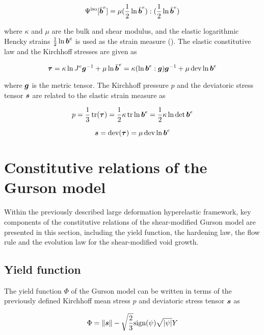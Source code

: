 \begin{equation}
  \Psi^{\rm iso}[\bar{{\boldsymbol{b}}}^e] =
  \mu(\frac{1}{2}\ln\bar{{\boldsymbol{b}}}^e):(\frac{1}{2}\ln\bar{{\boldsymbol{b}}}^e)
\end{equation}

where $\kappa$ and $\mu$ are the bulk and shear modulus, and the
elastic logarithmic Hencky strains $\frac{1}{2}\ln{\boldsymbol{b}}^e$ is used as
the strain measure (\cite{Steinmann1994}). The elastic constitutive
law and the Kirchhoff stresses are given as

\begin{equation}\label{eq:Kirchhoff}
{\boldsymbol{\tau}}=\kappa\ln J^e{\boldsymbol{g}}^{-1} + \mu\ln\bar{{\boldsymbol{b}}}^e =
\kappa(\ln{\boldsymbol{b}}^e:{\boldsymbol{g}}){\boldsymbol{g}}^{-1} + \mu\operatorname{\text{dev}}\ln{\boldsymbol{b}}^e
\end{equation}

where ${\boldsymbol{g}}$ is the metric tensor. The Kirchhoff pressure $p$ and the
deviatoric stress tensor ${\boldsymbol{s}}$ are related to the elastic strain
measure as

\begin{equation}\label{eq:p}
p = \frac{1}{3}\operatorname{\text{tr}}({\boldsymbol{\tau}}) = \frac{1}{2}\kappa\operatorname{\text{tr}}\ln{\boldsymbol{b}}^e =
\frac{1}{2}\kappa\ln\det{\boldsymbol{b}}^e
\end{equation}

\begin{equation}\label{eq:s}
{\boldsymbol{s}} = \operatorname{\text{dev}}({\boldsymbol{\tau}}) = \mu\operatorname{\text{dev}}\ln{\boldsymbol{b}}^e
\end{equation}

\section{Constitutive relations of the Gurson model}
Within the previously described large deformation hyperelastic
framework, key components of the constitutive relations of the
shear-modified Gurson model are presented in this section, including
the yield function, the hardening law, the flow rule and the evolution
law for the shear-modified void growth.

\subsection{Yield function}

The yield function $\Phi$ of the Gurson model can be written in terms
of the previously defined Kirchhoff mean stress $p$ and deviatoric
stress tensor ${\boldsymbol{s}}$ as

\begin{equation}\label{eq:Phi}
\Phi = \|{\boldsymbol{s}}\| - \sqrt{\frac{2}{3}}{\rm sign}(\psi)\sqrt{|\psi|} Y
\end{equation}

